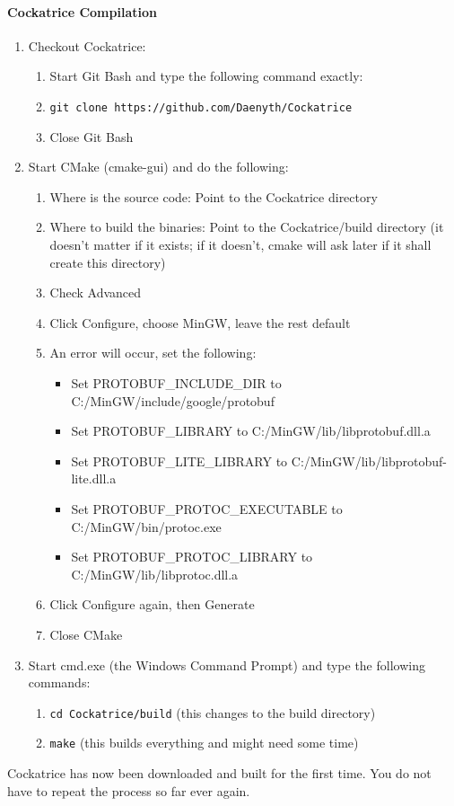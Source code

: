 \documentclass[a4paper]{scrbook}
\newcommand{\shellcmd}[1]{\texttt{\scriptsize #1}}
\begin{document}
\paragraph{Cockatrice Compilation}
\begin{enumerate}
 \item Checkout Cockatrice:
    \begin{enumerate}
     \item Start Git Bash and type the following command exactly:
     \item \shellcmd{git clone https://github.com/Daenyth/Cockatrice}
     \item Close Git Bash
    \end{enumerate}
 \item Start CMake (cmake-gui) and do the following:
    \begin{enumerate}
     \item Where is the source code: Point to the Cockatrice directory
     \item Where to build the binaries: Point to the Cockatrice/build directory (it doesn't matter if it exists; if it doesn't, cmake will ask later if it shall create this directory)
     \item Check Advanced
     \item Click Configure, choose MinGW, leave the rest default
     \item An error will occur, set the following:
     	\begin{itemize}
	 \item Set PROTOBUF\_INCLUDE\_DIR to C:/MinGW/include/google/protobuf
	 \item Set PROTOBUF\_LIBRARY to C:/MinGW/lib/libprotobuf.dll.a
	 \item Set PROTOBUF\_LITE\_LIBRARY to C:/MinGW/lib/libprotobuf-lite.dll.a
	 \item Set PROTOBUF\_PROTOC\_EXECUTABLE to C:/MinGW/bin/protoc.exe
	 \item Set PROTOBUF\_PROTOC\_LIBRARY to C:/MinGW/lib/libprotoc.dll.a
	\end{itemize}
     \item Click Configure again, then Generate
     \item Close CMake
    \end{enumerate}
 \item Start cmd.exe (the Windows Command Prompt) and type the following commands:
    \begin{enumerate}
     \item \shellcmd{cd Cockatrice/build} (this changes to the build directory)
     \item \shellcmd{make} (this builds everything and might need some time)
    \end{enumerate}
\end{enumerate}
Cockatrice has now been downloaded and built for the first time. You do not have to repeat the process so far ever again.
\end{document}
